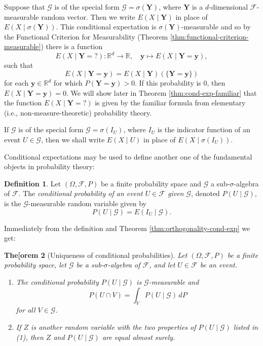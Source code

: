 \documentclass[11pt]{book}
\newtheorem{thm}{The[orem}[section]
\theoremstyle{definition}
\newtheorem{defn}[thm]{Definition}
\numberwithin{equation}{section}
\begin{document}
Suppose that $\mathcal{G}$ is of the special form $\mathcal{G} = \sigma(\mathbf{Y})$, where $\mathbf{Y}$ is a $d$-dimensional $\mathcal{F}$-measurable random vector. Then we write $E(X \mid \mathbf{Y})$ in place of $E(X\mid \sigma(\mathbf{Y}))$. This conditional expectation is $\sigma(\mathbf{Y})$-measurable and so by the Functional Criterion for Measurability (Theorem \ref{thm:functional-criterion-measurable}) there is a function
\begin{equation}\label{eq:cond-exp-func}
	E(X \mid \mathbf{Y} = {?}) :\mathbb{R}^d \to \mathbb{R}, \quad \mathbf{y} \mapsto E(X \mid \mathbf{Y} = \mathbf{y}),
\end{equation}
such that
\[
	E(X \mid \mathbf{Y} = \mathbf{y}) = E(X \mid \mathbf{Y})(\{ \mathbf{Y} = \mathbf{y} \})
\]
for each $\mathbf{y} \in \mathbb{R}^d$ for which $P(\mathbf{Y} = \mathbf{y})>0$. If this probability is $0$, then $E(X\mid \mathbf{Y}=\mathbf{y})=0$. We will show later in Theorem \ref{thm:cond-exp-familiar} that the function $E(X\mid \mathbf{Y} = {?})$ is given by the familiar formula from elementary (i.e., non-measure-theoretic) probability theory.

If $\mathcal{G}$ is of the special form $\mathcal{G} = \sigma(I_U)$, where $I_U$ is the indicator function of an event $U\in \mathcal{G}$, then we shall write $E(X \mid U)$ in place of $E(X \mid \sigma(I_U))$.

Conditional expectations may be used to define another one of the fundamental objects in probability theory:

\begin{defn}
	Let $(\Omega, \mathcal{F}, P)$ be a finite probability space and $\mathcal{G}$ a sub-$\sigma$-algebra of $\mathcal{F}$. The \textit{conditional probability of an event $U\in \mathcal{F}$ given $\mathcal{G}$}, denoted $P(U \mid \mathcal{G})$, is the $\mathcal{G}$-measurable random variable given by
	\[
		P(U \mid \mathcal{G}) = E(I_U \mid \mathcal{G}).
	\]
\end{defn}

Immediately from the definition and Theorem \ref{thm:orthogonality-cond-exp} we get:

\begin{thm}[Uniqueness of conditional probabilities]\label{thm:orthogonality-cond-prop}
	Let $(\Omega, \mathcal{F}, P)$ be a finite probability space, let $\mathcal{G}$ be a sub-$\sigma$-algebra of $\mathcal{F}$, and let $U\in \mathcal{F}$ be an event.
	\begin{enumerate}
		\item The conditional probability $P(U\mid \mathcal{G})$ is $\mathcal{G}$-measurable and
		      \[
			      P(U\cap V) = \int_V P(U\mid \mathcal{G}) \, dP
		      \]
		      for all $V\in \mathcal{G}$.
		\item If $Z$ is another random variable with the two properties of $P(U\mid \mathcal{G})$ listed in (1), then $Z$ and $P(U\mid \mathcal{G})$ are equal almost surely.
	\end{enumerate}
\end{thm}
\end{document}
